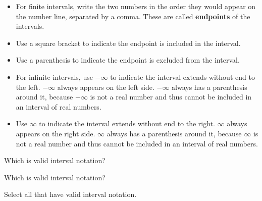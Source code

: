 \documentclass{ximera}
\begin{document}
\begin{itemize}
\item For finite intervals, write the two numbers in the order they would appear on the number line, separated by a comma.  These are called \textbf{endpoints} of the intervals.
\item Use a square bracket to indicate the endpoint is included in the interval.
\item Use a parenthesis to indicate the endpoint is excluded from the interval.
\item For infinite intervals, use $-\infty$ to indicate the interval extends without end to the left. $-\infty$ always appears on the left side. $-\infty$ always has a parenthesis around it, because $-\infty$ is not a real number and thus cannot be included in an interval of real numbers.
\item Use $\infty$ to indicate the interval extends without end to the right. $\infty$ always appears on the right side. $\infty$ always has a parenthesis around it, because $\infty$ is not a real number and thus cannot be included in an interval of real numbers. 
\end{itemize}


\begin{question}
Which is valid interval notation?
	\begin{multipleChoice}
	\choice {$[3, -2)$}
	\choice [correct]{$[-2, 3)$}
	\end{multipleChoice}
\end{question}



\begin{question}
Which is valid interval notation?
	\begin{multipleChoice}
	\choice {$[1, \infty]$}
	\choice [correct]{$[1, \infty)$}
	\end{multipleChoice}
\end{question}



\begin{question}
Select all that have valid interval notation.
	\begin{selectAll}
	\choice {$[-3, -5]$}
	\choice [correct]{$[1, 8)$}
	\choice [correct]{$(-\infty, -4]$}
	\choice {$[-\infty, 7)$}
	\choice [correct]{$(-1, 2]$}
	\choice {$[6, 2]$}
	\end{selectAll}
\end{question}
\end{document}
